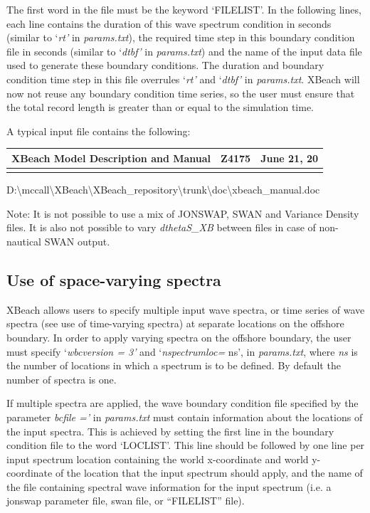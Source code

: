 The first word in the file must be the keyword `FILELIST'. In the following lines, each line contains the duration of this wave spectrum condition in seconds (similar to `\textit{rt'} in \textit{params.txt}), the required time step in this boundary condition file in seconds (similar to `\textit{dtbf'} in \textit{params.txt}) and the name of the input data file used to generate these boundary conditions. The duration and boundary condition time step in this file overrules `\textit{rt'} and `\textit{dtbf'} in \textit{params.txt}. XBeach will now not reuse any boundary condition time series, so the user must ensure that the total record length is greater than or equal to the simulation time.

A typical input file contains the following:

\begin{tabular}{|p{1.5in}|p{1.5in}|p{1.5in}|} \hline 
XBeach Model Description and Manual & Z4175 & June 21, 20 \\ \hline 
&  &  \\ \hline 
\end{tabular}

D:\textbackslash mccall\textbackslash XBeach\textbackslash XBeach\_repository\textbackslash trunk\textbackslash doc\textbackslash xbeach\_manual.doc



Note: It is not possible to use a mix of JONSWAP, SWAN and Variance Density files. It is also not possible to vary \textit{dthetaS\_XB} between files in case of non-nautical SWAN output. 


\subsection{ Use of space-varying spectra}

XBeach allows users to specify multiple input wave spectra, or time series of wave spectra (see use of time-varying spectra) at separate locations on the offshore boundary. In order to apply varying spectra on the offshore boundary, the user must specify `\textit{wbcversion = 3'} and `\textit{nspectrumloc= }ns', in \textit{params.txt}, where \textit{ns} is the number of locations in which a spectrum is to be defined. By default the number of spectra is one.

If multiple spectra are applied, the wave boundary condition file specified by the parameter \textit{bcfile ='} in \textit{params.txt} must contain information about the locations of the input spectra. This is achieved by setting the first line in the boundary condition file to the word `LOCLIST'. This line should be followed by one line per input spectrum location containing the world x-coordinate and world y-coordinate of the location that the input spectrum should apply, and the name of the file containing spectral wave information for the input spectrum (i.e. a jonswap parameter file, swan file, or ``FILELIST'' file).

